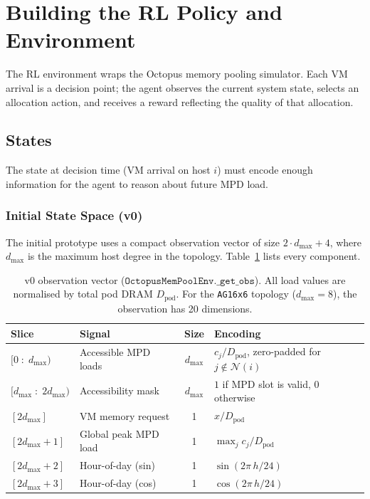 \documentclass[11pt]{article}
\begin{document}
\section{Building the RL Policy and Environment}

The RL environment wraps the Octopus memory pooling simulator.  Each VM
arrival is a decision point; the agent observes the current system state,
selects an allocation action, and receives a reward reflecting the quality of
that allocation.

\subsection{States}
\label{sec:states}

The state at decision time (VM arrival on host $i$) must encode enough
information for the agent to reason about future MPD load.

\subsubsection*{Initial State Space (v0)}

The initial prototype uses a compact observation vector of size
$2 \cdot d_{\max} + 4$, where $d_{\max}$ is the maximum host degree in the
topology.  Table~\ref{tab:states_v0} lists every component.

\begin{table}[H]
\centering
\small
\renewcommand{\arraystretch}{1.3}
\begin{tabular}{llcl}
\toprule
\textbf{Slice} & \textbf{Signal} & \textbf{Size} & \textbf{Encoding} \\
\midrule
$[0 \;:\; d_{\max})$
  & Accessible MPD loads
  & $d_{\max}$
  & $c_j / D_{\text{pod}}$, zero-padded for $j \notin \mathcal{N}(i)$ \\
$[d_{\max} \;:\; 2 d_{\max})$
  & Accessibility mask
  & $d_{\max}$
  & $1$ if MPD slot is valid, $0$ otherwise \\
$[2 d_{\max}]$
  & VM memory request
  & 1
  & $x / D_{\text{pod}}$ \\
$[2 d_{\max}{+}1]$
  & Global peak MPD load
  & 1
  & $\max_j c_j / D_{\text{pod}}$ \\
$[2 d_{\max}{+}2]$
  & Hour-of-day (sin)
  & 1
  & $\sin(2\pi\, h / 24)$ \\
$[2 d_{\max}{+}3]$
  & Hour-of-day (cos)
  & 1
  & $\cos(2\pi\, h / 24)$ \\
\bottomrule
\end{tabular}
\caption{v0 observation vector ($\texttt{OctopusMemPoolEnv.\_get\_obs}$).
All load values are normalised by total pod DRAM $D_{\text{pod}}$.
For the \texttt{AG16x6} topology ($d_{\max} = 8$), the observation
has 20 dimensions.}
\label{tab:states_v0}
\end{table}
\end{document}
